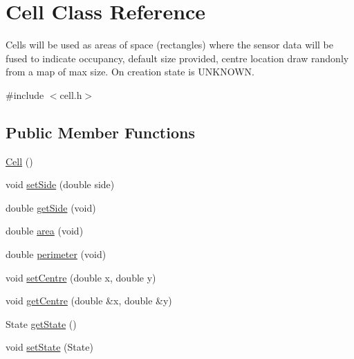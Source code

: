 \hypertarget{classCell}{}\section{Cell Class Reference}
\label{classCell}


Cells will be used as areas of space (rectangles) where the sensor data will be fused to indicate occupancy, default size provided, centre location draw randonly from a map of max size. On creation state is U\+N\+K\+N\+O\+WN.  




{\ttfamily \#include $<$cell.\+h$>$}

\subsection*{Public Member Functions}
\begin{DoxyCompactItemize}
\item 
\hyperlink{classCell_a394510643e8664cf12b5efaf5cb99f71}{Cell} ()
\item 
void \hyperlink{classCell_a9c4fd400ffbf61fe18073f3b244614ab}{set\+Side} (double side)
\item 
double \hyperlink{classCell_a8369e6773b462215ea3c13d216621cb7}{get\+Side} (void)
\item 
double \hyperlink{classCell_ad4fa31d97490fac2a1d11f3afaea4e67}{area} (void)
\item 
double \hyperlink{classCell_af02495b8e758ee82478134fd491f3e13}{perimeter} (void)
\item 
void \hyperlink{classCell_a882f75366d9cf6477d1fd7f9dd54519b}{set\+Centre} (double x, double y)
\item 
void \hyperlink{classCell_a1087822ba50d7afea999824cca8cc1f4}{get\+Centre} (double \&x, double \&y)
\item 
State \hyperlink{classCell_a88d636c8c89c53d4d62411feb4478ca4}{get\+State} ()
\item 
void \hyperlink{classCell_a7ad7f681c8837641408683c433a7c69d}{set\+State} (State)
\end{DoxyCompactItemize}
